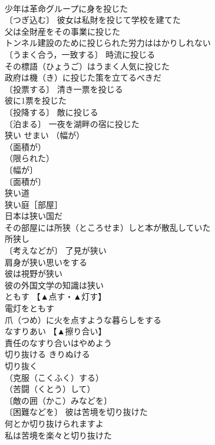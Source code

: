 \documentclass[8pt]{extreport}
\begin{document}
\begin{CJK}{UTF8}{min}
\\	少年は革命グループに身を投じた 
\\	〔つぎ込む〕 彼女は私財を投じて学校を建てた 
\\	父は全財産をその事業に投じた 
\\	トンネル建設のために投じられた労力ははかりしれない 
\\	〔うまく合う，一致する〕 時流に投じる 
\\	その標語（ひょうご）はうまく人気に投じた 
\\	政府は機（き）に投じた策を立てるべきだ 
\\	〔投票する〕 清き一票を投じる 
\\	彼に1票を投じた 
\\	〔投降する〕 敵に投じる 
\\	〔泊まる〕 一夜を湖畔の宿に投じた 
\\	狭い	せまい	（幅が）
\\	（面積が）
\\	（限られた）
\\	〔幅が〕
\\	〔面積が〕
\\	狭い道 
\\	狭い庭［部屋］ 
\\	日本は狭い国だ 
\\	その部屋には所狭（ところせま）しと本が散乱していた 
\\	所狭し　
\\	〔考えなどが〕 了見が狭い 
\\	肩身が狭い思いをする 
\\	彼は視野が狭い 
\\	彼の外国文学の知識は狭い 
\\	ともす	【▲点す・▲灯す】	
\\	電灯をともす 
\\	爪（つめ）に火を点すような暮らしをする 
\\	なすりあい	【▲擦り合い】	
\\	責任のなすり合いはやめよう 
\\	切り抜ける	きりぬける	
\\	切り抜く 
\\	（克服（こくふく）する）
\\	（苦闘（くとう）して）
\\	〔敵の囲（かこ）みなどを〕
\\	〔困難などを〕 彼は苦境を切り抜けた 
\\	何とか切り抜けられますよ 
\\	私は苦境を楽々と切り抜けた 

\end{CJK}
\end{document}
